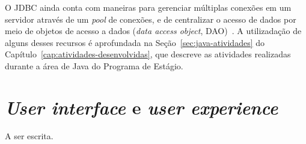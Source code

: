 O JDBC ainda conta com maneiras para gerenciar múltiplas conexões em um servidor através de um \textit{pool} de conexões, e de centralizar o acesso de dados por meio de objetos de acesso a dados (\textit{data access object}, DAO)~\cite{databaseprogramming-2000}. A utilizadação de alguns desses recursos é aprofundada na Seção~\ref{sec:java-atividades} do Capítulo~\ref{cap:atividades-desenvolvidas}, que descreve as atividades realizadas durante a área de Java do Programa de Estágio.

\section{\textit{User interface} e \textit{user experience}}
\label{sec:user-interface-e-user-experience}

A ser escrita.
